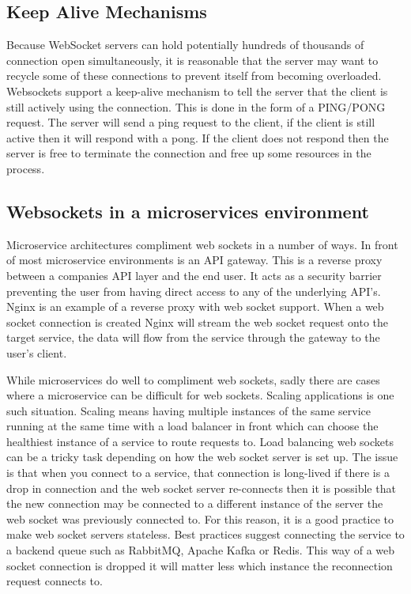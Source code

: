 \subsection{Keep Alive Mechanisms}

Because WebSocket servers can hold potentially hundreds of thousands of connection open simultaneously, it is reasonable that the server may want to recycle some of these connections to prevent itself from becoming overloaded. Websockets support a keep-alive mechanism to tell the server that the client is still actively using the connection. This is done in the form of a PING/PONG request. The server will send a ping request to the client, if the client is still active then it will respond with a pong. If the client does not respond then the server is free to terminate the connection and free up some resources in the process. 

\subsection{Websockets in a microservices environment}

Microservice architectures compliment web sockets in a number of ways. In front of most microservice environments is an API gateway\cite{6885428}. This is a reverse proxy between a companies API layer and the end user. It acts as a security barrier preventing the user from having direct access to any of the underlying API's. Nginx is an example of a reverse proxy with web socket support. When a web socket connection is created Nginx will stream the web socket request onto the target service, the data will flow from the service through the gateway to the user's client. 

While microservices do well to compliment web sockets, sadly there are cases where a microservice can be difficult for web sockets. Scaling applications is one such situation. Scaling means having multiple instances of the same service running at the same time with a load balancer in front which can choose the healthiest instance of a service to route requests to. Load balancing web sockets can be a tricky task depending on how the web socket server is set up. The issue is that when you connect to a service, that connection is long-lived if there is a drop in connection and the web socket server re-connects then it is possible that the new connection may be connected to a different instance of the server the web socket was previously connected to. For this reason, it is a good practice to make web socket servers stateless. Best practices suggest connecting the service to a backend queue such as RabbitMQ, Apache Kafka or Redis. This way of a web socket connection is dropped it will matter less which instance the reconnection request connects to.


